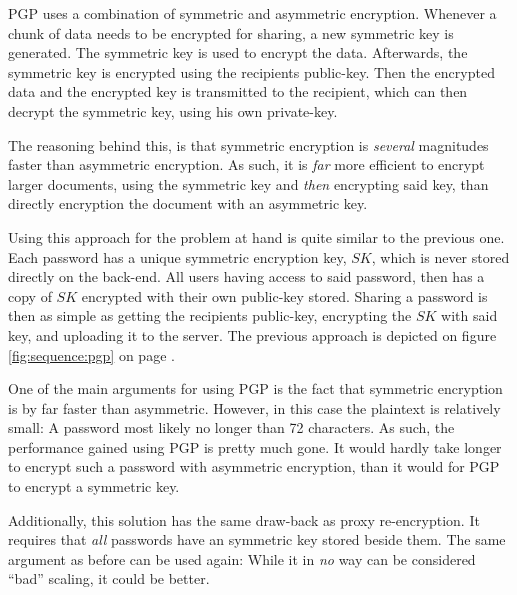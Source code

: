 				PGP uses a combination of symmetric and asymmetric encryption. Whenever a chunk of data needs to be encrypted for sharing, a new symmetric key is generated. The symmetric key is used to encrypt the data. Afterwards, the symmetric key is encrypted using the recipients public-key. Then the encrypted data and the encrypted key is transmitted to the recipient, which can then decrypt the symmetric key, using his own private-key. 

				The reasoning behind this, is that symmetric encryption is \emph{several} magnitudes faster than asymmetric encryption. As such, it is \emph{far} more efficient to encrypt larger documents, using the symmetric key and \emph{then} encrypting said key, than directly encryption the document with an asymmetric key.

				Using this approach for the problem at hand is quite similar to the previous one. Each password has a unique symmetric encryption key, $SK$, which is never stored directly on the back-end. All users having access to said password, then has a copy of $SK$ encrypted with their own public-key stored. Sharing a password is then as simple as getting the recipients public-key, encrypting the $SK$ with said key, and uploading it to the server. The previous approach is depicted on figure \ref{fig:sequence:pgp} on page \pageref{fig:sequence:pgp}.

				One of the main arguments for using PGP is the fact that symmetric encryption is by far faster than asymmetric. However, in this case the plaintext is relatively small: A password most likely no longer than 72 characters. As such, the performance gained using PGP is pretty much gone. It would hardly take longer to encrypt such a password with asymmetric encryption, than it would for PGP to encrypt a symmetric key.

				Additionally, this solution has the same draw-back as proxy re-encryption. It requires that \emph{all} passwords have an symmetric key stored beside them. The same argument as before can be used again: While it in \emph{no} way can be considered ``bad'' scaling, it could be better.

